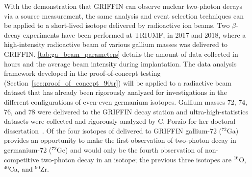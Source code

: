 \documentclass[cnatzke_thesis_proposal.tex]{subfiles}
\begin{document}
With the demonstration that GRIFFIN can observe nuclear two-photon decays via a source measurement, the same analysis and event selection techniques can be applied to a short-lived isotope delivered by radioactive ion beams. 
Two $\beta$-decay experiments have been performed at TRIUMF, in 2017 and 2018, where a high-intensity radioactive beam of various gallium masses was delivered to GRIFFIN. 
\ref{tab:ga_beam_parameters} details the amount of data collected in hours and the average beam intensity during implantation.
The data analysis framework developed in the proof-of-concept testing (Section~\ref{sec:proof_of_concept_90sr}) will be applied to a radiactive beam dataset that has already been rigorously analyzed for investigations in the different configurations of even-even germanium isotopes.
Gallium masses 72, 74, 76, and 78 were delivered to the GRIFFIN decay station and ultra-high-statistics datasets were collected and rigorously analyzed by C. Porzio for her doctoral dissertation~\cite{porzio_configuration_2021}.
Of the four isotopes of delivered to GRIFFIN gallium-72 ($^{72}$Ga) provides an opportunity to make the first observation of two-photon decay in germanium-72 ($^{72}$Ge) and would only be the fourth observation of non-competitive two-photon decay in an isotope; the previous three isotopes are $^{16}$O, $^{40}$Ca, and $^{90}$Zr.
\end{document}
